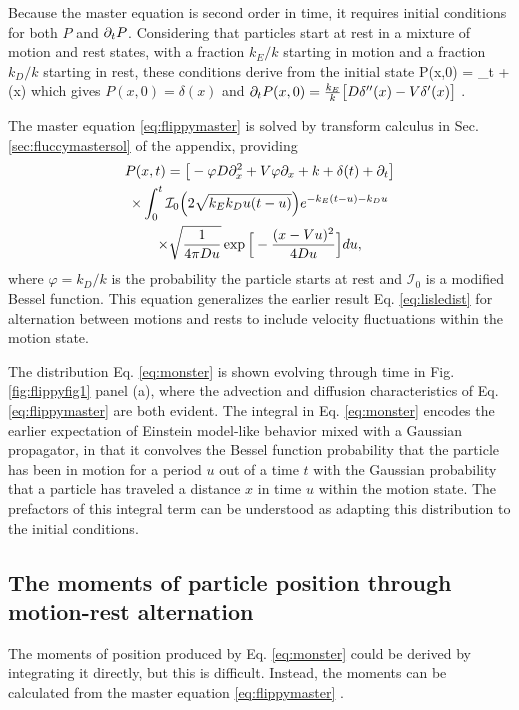 Because the master equation is second order in time, it requires initial conditions for both $P$ and $\partial_t P$. Considering that particles start at rest in a mixture of motion and rest states, with a fraction $k_E/k$ starting in motion and a fraction $k_D/k$ starting in rest, these conditions derive from the initial state 
\be P(x,0) = \lim_{t }   \exp{}+ \delta(x)\ee
which gives $P(x,0) = \delta(x)$ and $ \partial_t P(x,0) = \frac{k_E}{k}\big[D\delta''(x)-V \delta'(x) \big]$ \citep[cf.][]{Weiss2002a}.

The master equation \ref{eq:flippymaster} is solved by transform calculus in Sec. \ref{sec:fluccymastersol} of the appendix, providing
\begin{multline} P(x,t) = \big[-\varphi D\partial_x^2 + V\varphi \partial_x + k + \delta(t) +  \partial_t \big]\\
	\times \int_0^t \mathcal{I}_0\Big( 2 \sqrt{k_Ek_D u(t-u)}\Big) e^{-k_E(t-u)-k_D u} \\ \times \sqrt{ \frac{1}{4\pi D u}} \exp\Big[- \frac{(x-Vu)^2}{4Du}\Big] du, \label{eq:monster}
 \end{multline}
where $\varphi=k_D/k$ is the probability the particle starts at rest and $\mathcal{I}_0$ is a modified Bessel function. This equation generalizes the earlier result Eq. \ref{eq:lisledist} for alternation between motions and rests to include velocity fluctuations within the motion state.

The distribution Eq. \ref{eq:monster} is shown evolving through time in Fig. \ref{fig:flippyfig1} panel (a), where the advection and diffusion characteristics of Eq. \ref{eq:flippymaster} are both evident. The integral in Eq. \ref{eq:monster} encodes the earlier expectation of Einstein model-like behavior mixed with a Gaussian propagator, in that it convolves the Bessel function probability that the particle has been in motion for a period $u$ out of a time $t$ with the Gaussian probability that a particle has traveled a distance $x$ in time $u$ within the motion state. The prefactors of this integral term can be understood as adapting this distribution to the initial conditions.

\subsection{The moments of particle position through motion-rest alternation}

The moments of position produced by Eq. \ref{eq:monster} could be derived by integrating it directly, but this is difficult. Instead, the moments can be calculated from the master equation \ref{eq:flippymaster} \citep[e.g.][]{Cox1965}. 

